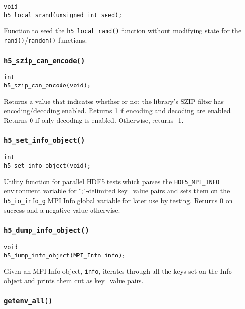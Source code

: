 \documentclass[../HDF5_RFC.tex]{subfiles}
\begin{document}
\begin{verbatim}
void
h5_local_srand(unsigned int seed);
\end{verbatim}

Function to seed the \texttt{h5\_local\_rand()} function without modifying state for the \texttt{rand()}/\texttt{random()} functions.

\subsubsection{\texttt{h5\_szip\_can\_encode()}}

\begin{verbatim}
int
h5_szip_can_encode(void);
\end{verbatim}

Returns a value that indicates whether or not the library's SZIP filter has encoding/decoding enabled.
Returns 1 if encoding and decoding are enabled. Returns 0 if only decoding is enabled. Otherwise, returns
-1.

\subsubsection{\texttt{h5\_set\_info\_object()}}

\begin{verbatim}
int
h5_set_info_object(void);
\end{verbatim}

Utility function for parallel HDF5 tests which parses the \texttt{HDF5\_MPI\_INFO} environment variable
for ";"-delimited key=value pairs and sets them on the \texttt{h5\_io\_info\_g} MPI Info global variable for later use by testing. Returns 0 on success and a negative value otherwise.

\subsubsection{\texttt{h5\_dump\_info\_object()}}

\begin{verbatim}
void
h5_dump_info_object(MPI_Info info);
\end{verbatim}

Given an MPI Info object, \texttt{info}, iterates through all the keys set on the Info object and
prints them out as key=value pairs.

\subsubsection{\texttt{getenv\_all()}}
\end{document}
